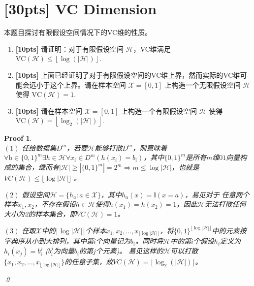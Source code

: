\documentclass[a4paper,UTF8]{article}
\numberwithin{equation}{section}
\newtheorem*{myProof}{Proof}
\begin{document}
\section{[30pts] VC Dimension}
\noindent 本题目探讨有限假设空间情况下的VC维的性质。

\begin{enumerate}[(1)]
	\item \textbf{[10pts]}  请证明：对于有限假设空间 $\mathcal{H}$，VC维满足 $\mbox{VC}(\mathcal{H}) \leq \left \lfloor \log(\left| \mathcal{H} \right| ) \right \rfloor$.
	\item \textbf{[10pts]}  上面已经证明了对于有限假设空间的VC维上界，然而实际的VC维可能会远小于这个上界。请在样本空间 $\mathcal{X} = [0,1]$ 上构造一个无限假设空间 $\mathcal{H}$ 使得 $\mbox{VC}(\mathcal{H}) = 1$.
	\item \textbf{[10pts]}  请在样本空间 $\mathcal{X} = [0,1]$ 上构造一个有限假设空间 $\mathcal{H}$ 使得 $\mbox{VC}(\mathcal{H}) = \left \lfloor \log_2(\left| \mathcal{H} \right| ) \right \rfloor $.
\end{enumerate}

\begin{myProof}~\\

$(1)$ 任给数据集$D^m$，若要$\mathcal{H}$能够打散$D^m$，则意味着$\forall \mathrm{b} \in \{0, 1\}^{m} \exists h \in \mathcal{H} \forall x_i \in D^m(  h(x_i) = b_i )$，其中$\{0, 1\}^m$是所有$m$维$01$向量构成的集合，继而有$|\mathcal{H}| \ge |\{0, 1\}^m| = 2^m \Rightarrow m \le \log |\mathcal {H}|$，也就是$VC(\mathcal{H}) \le \lfloor \log |\mathcal{H}| \rfloor$ 。

$(2)$ 假设空间$\mathcal{H} = \{h_a: a \in \mathcal{X}\}$，其中$h_a(x) = \mathbb{I}(x = a)$，易见对于 任意两个样本$x_1, x_2$，不存在假设$h \in \mathcal{H}$使得$h(x_1) = h(x_2) = 1$，因此$\mathcal{H}$无法打散任何大小为2的样本集合，即$VC(\mathcal{H}) = 1$。

$(3)$ 任取$\mathcal{X}$中的$\lfloor \log | \mathcal{H}| \rfloor$个样本$x_1, x_2, ..., x_{\lfloor \log | \mathcal{H}| \rfloor}$，将$\{0, 1\}^{\lfloor \log | \mathcal{H}| \rfloor}$中的元素按字典序从小到大排列，其中第$i$个向量记为$b_i$。同时将$\mathcal{H}$中的第$i$个假设$h_i$定义为$h_i(x_j) = b_i^j$ ($b_i^j$为向量$b_i$的第$j$个元素)。
易见这样的$\mathcal{H}$可以打散$\{x_1, x_2, ..., x_{\lfloor \log | \mathcal{H}| \rfloor}\}$的任意子集，故$VC(\mathcal{H}) = \lfloor \log_2(|\mathcal{H}|)\rfloor$。

\qed
\end{myProof}
\end{document}
